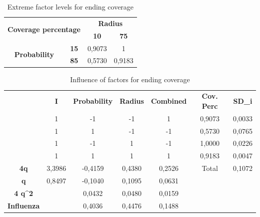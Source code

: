 \begin{table}[h!]
\centering
\begin{tabular}{|cc|cc|}
\hline
\multicolumn{2}{|c|}{\multirow{2}{*}{\textbf{Coverage percentage}}} & \multicolumn{2}{c|}{\textbf{Radius}} \\ \cline{3-4} 
\multicolumn{2}{|c|}{} & \multicolumn{1}{c|}{\textbf{10}} & \textbf{75} \\ \hline
\multicolumn{1}{|c|}{\multirow{2}{*}{\textbf{Probability}}} & \textbf{15} & \multicolumn{1}{c|}{0,9073} & 1 \\ \cline{2-4} 
\multicolumn{1}{|c|}{} & \textbf{85} & \multicolumn{1}{c|}{0,5730} & 0,9183 \\ \hline
\end{tabular}
\caption{Extreme factor levels for ending coverage}
\label{tab:extreme-factors-end-coverage}
\end{table}

\begin{table}[H]
\centering
\begin{tabular}{c|c|c|c|c|cc}
\cline{2-7}
 & \textbf{I} & \textbf{Probability} & \textbf{Radius} & \textbf{Combined} & \multicolumn{1}{c|}{\textbf{Cov. Perc}} & \multicolumn{1}{c|}{\textbf{SD\_i}} \\ \cline{2-7} 
 & 1 & -1 & -1 & 1 & \multicolumn{1}{c|}{0,9073} & \multicolumn{1}{c|}{0,0033} \\ \cline{2-7} 
 & 1 & 1 & -1 & -1 & \multicolumn{1}{c|}{0,5730} & \multicolumn{1}{c|}{0,0765} \\ \cline{2-7} 
 & 1 & -1 & 1 & -1 & \multicolumn{1}{c|}{1,0000} & \multicolumn{1}{c|}{0,0226} \\ \cline{2-7} 
 & 1 & 1 & 1 & 1 & \multicolumn{1}{c|}{0,9183} & \multicolumn{1}{c|}{0,0047} \\ \hline
\multicolumn{1}{|c|}{\textbf{4q}} & 3,3986 & -0,4159 & 0,4380 & 0,2526 & \multicolumn{1}{c|}{Total} & \multicolumn{1}{c|}{0,1072} \\ \hline
\multicolumn{1}{|c|}{\textbf{q}} & 0,8497 & -0,1040 & 0,1095 & 0,0631 &  &  \\ \cline{1-5}
\multicolumn{1}{|c|}{\textbf{4 q\textasciicircum{}2}} &  & 0,0432 & 0,0480 & 0,0159 &  &  \\ \cline{1-5}
\multicolumn{1}{|c|}{\textbf{Influenza}} &  & 0,4036 & 0,4476 & 0,1488 &  &  \\ \cline{1-5}
\end{tabular}
\caption{Influence of factors for ending coverage}
\label{tab:influence-on-end-coverage}
\end{table}


